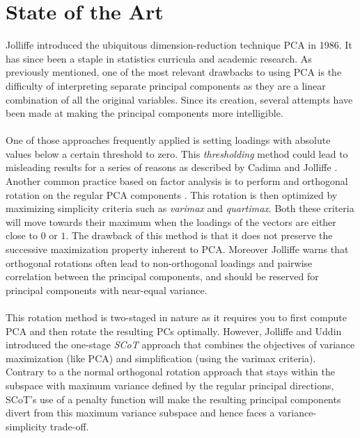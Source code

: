 \documentclass[11pt,letterpaper]{report}
\begin{document}
\section*{State of the Art}
Jolliffe \citeyear{Jolliffe1986} introduced the ubiquitous dimension-reduction technique PCA in 1986. It has since been a staple in statistics curricula and academic research. As previously mentioned, one of the most relevant drawbacks to using PCA is the difficulty of interpreting separate principal components as they are a linear combination of all the original variables. Since its creation, several attempts have been made at making the principal components more intelligible.\\
\\
One of those approaches frequently applied is setting loadings with absolute values below a certain threshold to zero. This \textit{thresholding} method could lead to misleading results for a series of reasons as described by Cadima and Jolliffe \citeyear{Cadima1995}.
Another common practice based on factor  analysis is to perform and orthogonal rotation on the regular PCA components \cite{Richman1986, Richman1987}. This rotation is then optimized by maximizing simplicity criteria such as \textit{varimax} and \textit{quartimax}. Both these criteria will move towards their maximum when the loadings of the vectors are either close to $0$ or $1$. The drawback of this method is that it does not preserve the successive maximization property inherent to PCA. Moreover Jolliffe \citeyear{Jolliffe1989, Jolliffe1995} warns that orthogonal rotations often lead to non-orthogonal loadings and pairwise correlation between the principal components, and should be reserved for principal components with near-equal variance.\\
\\
This rotation method is two-staged in nature as it requires you to first compute PCA and then rotate the resulting PCs optimally. However, Jolliffe and Uddin \citeyear{Jolliffe2000} introduced the one-stage \textit{SCoT} approach that combines the objectives of variance maximization (like PCA) and simplification (using the varimax criteria). Contrary to a the normal orthogonal rotation approach that stays within the subspace with maximum variance defined by the regular principal directions, SCoT's use of a penalty function will make the resulting principal components divert from this maximum variance subspace and hence faces a variance-simplicity trade-off.\\
\end{document}
